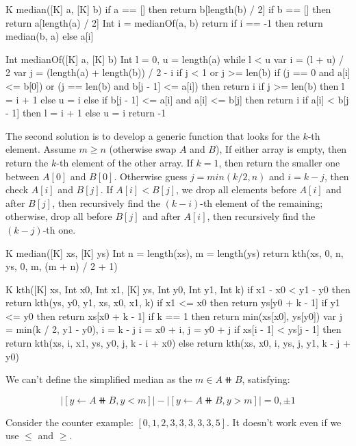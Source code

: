 \documentclass[b5paper]{article}
\begin{document}
\begin{Answer}
{\begin{Bourbaki}
K median([K] a, [K] b) {
    if a == [] then return b[length(b) / 2]
    if b == [] then return a[length(a) / 2]
    Int i = medianOf(a, b)
    return if i == -1 then return median(b, a) else a[i]
}

Int medianOf([K] a, [K] b) {
    Int l = 0, u = length(a)
    while l < u {
        var i = (l + u) / 2
        var j = (length(a) + length(b)) / 2  - i
        if j < 1 or j >= len(b) {
            if (j == 0 and a[i] <= b[0]) or
               (j == len(b) and b[j - 1] <= a[i]) then return i
            if j >= len(b) then l = i + 1 else u = i
        } else {
            if b[j - 1]  <= a[i] and a[i] <= b[j] then return i
            if a[i] < b[j - 1] then l = i + 1 else u = i
        }
    }
    return -1
}
\end{Bourbaki}

The second solution is to develop a generic function that looks for the $k$-th element. Assume $m \geq n$ (otherwise swap $A$ and $B$), If either array is empty, then return the $k$-th element of the other array. If $k = 1$, then return the smaller one between $A[0]$ and $B[0]$. Otherwise guess $j = min(k/2, n)$ and $i = k - j$, then check $A[i]$ and $B[j]$. If $A[i] < B[j]$, we drop all elements before $A[i]$ and after $B[j]$, then recursively find the $(k - i)$-th element of the remaining; otherwise, drop all before $B[j]$ and after $A[i]$, then recursively find the $(k-j)$-th one.

\begin{Bourbaki}
K median([K] xs, [K] ys) {
    Int n = length(xs), m = length(ys)
    return kth(xs, 0, n, ys, 0, m, (m + n) / 2 + 1)
}

K kth([K] xs, Int x0, Int x1, [K] ys, Int y0, Int y1, Int k) {
    if x1 - x0 < y1 - y0 then return kth(ys, y0, y1, xs, x0, x1, k)
    if x1 <= x0 then return ys[y0 + k - 1]
    if y1 <= y0 then return xs[x0 + k - 1]
    if k == 1 then return min(xs[x0], ys[y0])
    var j = min(k / 2, y1 - y0), i = k - j
    i = x0 + i, j = y0 + j
    if xs[i - 1] < ys[j - 1] then
        return kth(xs, i, x1, ys, y0, j, k - i + x0)
    else
        return kth(xs, x0, i, ys, j, y1, k - j + y0)
}
\end{Bourbaki}

We can't define the simplified median as the $m \in A \doubleplus B$, satisfying:

\[
|[y \gets A \doubleplus B, y < m]| - |[y \gets A \doubleplus B, y > m]| = 0, \pm 1
\]

Consider the counter example: $[0, 1, 2, 3, 3, 3, 3, 3, 5]$. It doesn't work even if we use $\leq$ and $\geq$.
}


\end{Answer}
\end{document}
